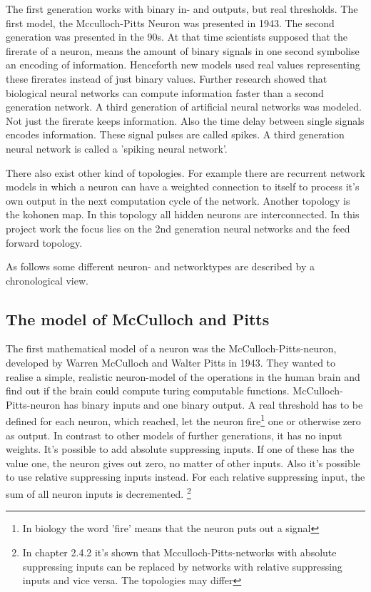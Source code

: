 \documentclass[10pt,a4paper,DIV=11]{scrreprt}
\begin{document}
The first generation works with binary in- and outputs, but real thresholds. The first model, the Mcculloch-Pitts Neuron was presented in 1943.
The second generation was presented in the 90s. At that time scientists supposed that the firerate of a neuron, means the amount of binary signals in one second symbolise an encoding of information. Henceforth new models used real values representing these firerates instead of just binary values.
Further research showed that biological neural networks can compute information faster than a second generation network.
A third generation of artificial neural networks was modeled. Not just the firerate keeps information. Also the time delay between single signals encodes information. These signal pulses are called spikes. A third generation neural network is called a 'spiking neural network'.
\cite{SNN}

There also exist other kind of topologies. For example there are recurrent network models in which a neuron can have a weighted connection to itself to process it's own output in the next computation cycle of the network. Another topology is the kohonen map. In this topology all hidden neurons are interconnected. In this project work the focus lies on the 2nd generation neural networks and the feed forward topology.


As follows some different neuron- and networktypes are described by a chronological view.
\subsection{The model of McCulloch and Pitts}
\label{sec:pitts}
The first mathematical model of a neuron was the McCulloch-Pitts-neuron,
developed by Warren McCulloch and Walter Pitts in 1943.\cite{NEURONMATH}
They wanted to realise a simple, realistic neuron-model of the operations in the human brain and find out if the brain could compute turing computable functions.
McCulloch-Pitts-neuron has binary inputs and one binary output.
A real threshold has to be defined for each neuron, which reached, let the neuron fire\footnote{In biology the word 'fire' means that the neuron puts out a signal} one or otherwise zero as output.
In contrast to other models of further generations, it has no input weights.
It's possible to add absolute suppressing inputs. If one of these has the value one, the neuron gives out zero, no matter of other inputs.
Also it's possible to use relative suppressing inputs instead. For each relative suppressing input, the sum of all neuron inputs is decremented.
\footnote{In \cite{rojas} chapter 2.4.2 it's shown that Mcculloch-Pitts-networks with absolute suppressing inputs can be replaced by networks with relative suppressing inputs and vice versa. The topologies may differ}
\end{document}
